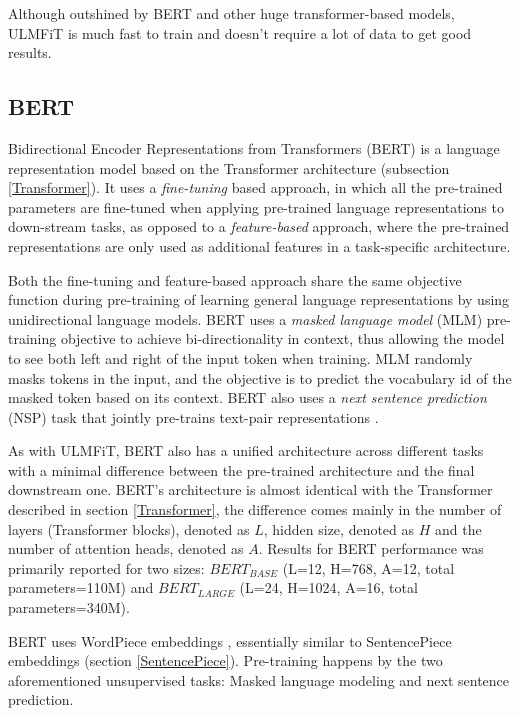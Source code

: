 Although outshined by BERT and other huge transformer-based models, ULMFiT is much fast to train and doesn't require a lot of data to get good results.



\subsection{BERT} \label{BERT}
Bidirectional Encoder Representations from Transformers (BERT) is a language representation model based on the Transformer \cite{vaswani2017} architecture (subsection \ref{Transformer}).
It uses a \textit{fine-tuning} based approach, in which all the pre-trained parameters are fine-tuned when applying pre-trained language representations to down-stream tasks, as opposed to a \textit{feature-based} approach, where the pre-trained representations are only used as additional features in a task-specific architecture.

Both the fine-tuning and feature-based approach share the same objective function during pre-training of learning general language representations by using unidirectional language models.
BERT uses a \textit{masked language model} (MLM) pre-training objective to achieve bi-directionality in context, thus allowing the model to see both left and right of the input token when training.
MLM randomly masks tokens in the input, and the objective is to predict the vocabulary id of the masked token based on its context.
BERT also uses a \textit{next sentence prediction} (NSP) task that jointly pre-trains text-pair representations \cite{devlin2019}.

As with ULMFiT, BERT also has a unified architecture across different tasks with a minimal difference between the pre-trained architecture and the final downstream one.
BERT's architecture is almost identical with the Transformer described in section \ref{Transformer}, the difference comes mainly in the number of layers (Transformer blocks), denoted as $L$, hidden size, denoted as $H$ and the number of attention heads, denoted as $A$.
Results for BERT performance was primarily reported for two sizes: $BERT_{BASE}$ (L=12, H=768, A=12, total parameters=110M) and $BERT_{LARGE}$ (L=24, H=1024, A=16, total parameters=340M).

BERT uses WordPiece embeddings \cite{wu2016}, essentially similar to SentencePiece embeddings (section \ref{SentencePiece}).
Pre-training happens by the two aforementioned unsupervised tasks: Masked language modeling and next sentence prediction.

